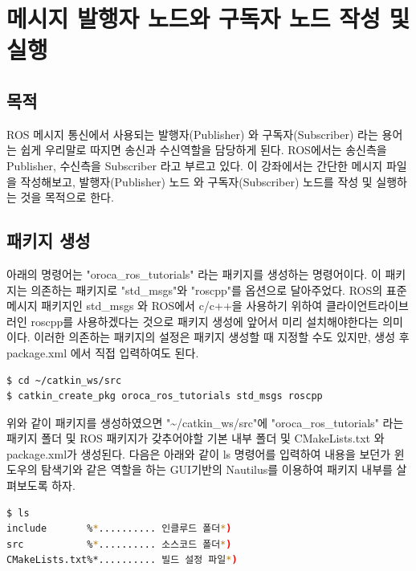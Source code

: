 \section{메시지 발행자 노드와 구독자 노드 작성 및 실행}

\subsection{목적}

ROS 메시지 통신에서 사용되는 발행자(Publisher) 와 구독자(Subscriber) 라는 용어는 쉽게 우리말로 따지면 송신과 수신역할을 담당하게 된다. ROS에서는 송신측을 Publisher, 수신측을 Subscriber 라고 부르고 있다. 이 강좌에서는 간단한 메시지 파일을 작성해보고, 발행자(Publisher) 노드 와 구독자(Subscriber) 노드를 작성 및 실행하는 것을 목적으로 한다.

\subsection{패키지 생성}

아래의 명령어는 "oroca\_ros\_tutorials" 라는 패키지를 생성하는 명령어이다. 이 패키지는 의존하는 패키지로 "std\_msgs"와 "roscpp"를 옵션으로 달아주었다. ROS의 표준 메시지 패키지인 std\_msgs 와 ROS에서 c/c++을 사용하기 위하여 클라이언트라이브러인 roscpp를 사용하겠다는 것으로 패키지 생성에 앞어서 미리 설치해야한다는 의미이다. 이러한 의존하는 패키지의 설정은 패키지 생성할 때 지정할 수도 있지만, 생성 후 package.xml 에서 직접 입력하여도 된다.

\begin{lstlisting}[language=ROS]
$ cd ~/catkin_ws/src
$ catkin_create_pkg oroca_ros_tutorials std_msgs roscpp
\end{lstlisting}

위와 같이 패키지를 생성하였으면 "\textasciitilde/catkin\_ws/src"에 "oroca\_ros\_tutorials" 라는 패키지 폴더 및 ROS 패키지가 갖추어야할 기본 내부 폴더 및 CMakeLists.txt 와 package.xml가 생성된다. 다음은 아래와 같이 ls 명령어를 입력하여 내용을 보던가 윈도우의 탐색기와 같은 역할을 하는 GUI기반의 Nautilus를 이용하여 패키지 내부를 살펴보도록 하자.

\begin{lstlisting}[language=bash]
$ ls
include       %*.......... 인클루드 폴더*)
src           %*.......... 소스코드 폴더*)
CMakeLists.txt%*.......... 빌드 설정 파일*)
\end{lstlisting}

